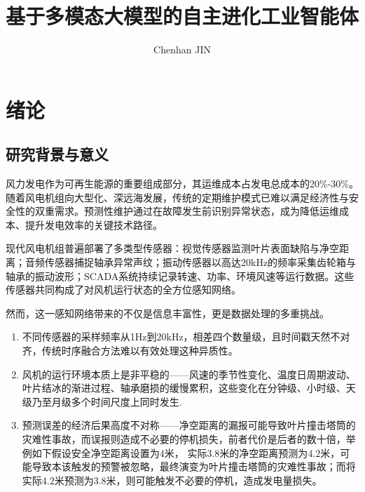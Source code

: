 \documentclass[12pt,a4paper]{article}
\title{基于多模态大模型的自主进化工业智能体}
\author{Chenhan JIN}
\date{}
\begin{document}
\maketitle
\section{绪论}

\subsection{研究背景与意义}

风力发电作为可再生能源的重要组成部分，其运维成本占发电总成本的20\%-30\%。随着风电机组向大型化、深远海发展，传统的定期维护模式已难以满足经济性与安全性的双重需求。预测性维护通过在故障发生前识别异常状态，成为降低运维成本、提升发电效率的关键技术路径。

现代风电机组普遍部署了多类型传感器：视觉传感器监测叶片表面缺陷与净空距离；音频传感器捕捉轴承异常声纹；振动传感器以高达20kHz的频率采集齿轮箱与轴承的振动波形；SCADA系统持续记录转速、功率、环境风速等运行数据。这些传感器共同构成了对风机运行状态的全方位感知网络。

然而，这一感知网络带来的不仅是信息丰富性，更是数据处理的多重挑战。
\begin{enumerate}
    \item 不同传感器的采样频率从1Hz到20kHz，相差四个数量级，且时间戳天然不对齐，传统时序融合方法难以有效处理这种异质性。
    \item 风机的运行环境本质上是非平稳的——风速的季节性变化、温度日周期波动、叶片结冰的渐进过程、轴承磨损的缓慢累积，这些变化在分钟级、小时级、天级乃至月级多个时间尺度上同时发生.
    \item 预测误差的经济后果高度不对称——净空距离的漏报可能导致叶片撞击塔筒的灾难性事故，而误报则造成不必要的停机损失，前者代价是后者的数十倍，举例如下假设安全净空距离设置为$4$米， 实际$3.8$米的净空距离预测为$4.2$米，可能导致本该触发的预警被忽略，最终演变为叶片撞击塔筒的灾难性事故；而将实际$4.2$米预测为$3.8$米，则可能触发不必要的停机，造成发电量损失。
\end{enumerate}
\end{document}
